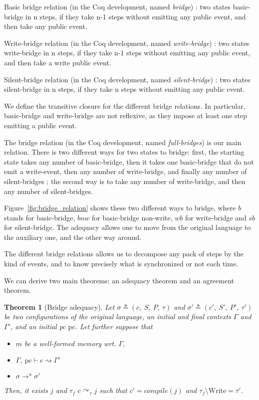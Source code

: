 \documentclass[10pt]{article}
\newcommand{\pc}{\mathrm{pc}}
\newcommand{\ctx}{\Gamma}
\newcommand{\conf}{\sigma}
\newcommand{\typing}[4]{ #1,~#2 \vdash #3 \rightsquigarrow #4}
\newcommand{\execn}[3] { #1 \rightarrow^{#2} #3 }
\newcommand{\bridge}[3] { #1 \curvearrowright_{#2} #3 }
\newtheorem{theorem}{Theorem}
\begin{document}

Basic bridge relation (in the Coq development, named \emph{bridge})
: two states basic-bridge in n steps, if they take n-1 steps without emitting any public
event, and then take any public event.

Write-bridge relation (in the Coq development, named \emph{write-bridge})
: two states write-bridge in n steps, if they take n-1 steps without emitting
any public event, and then take a write public event.

Silent-bridge relation (in the Coq development, named \emph{silent-bridge})
: two states silent-bridge in n steps, if they take n steps without emitting
any public event.

We define the transitive closure for the different bridge relations. In particular, basic-bridge and
write-bridge are not reflexive, as they impose at least one step emitting a public event.

The bridge relation (in the Coq development, named \emph{full-bridges}) is our main relation. There
is two different ways for two states to bridge: first,
the starting state takes any number of basic-bridge, then it takes one basic-bridge that do not emit
a write-event, then any number of write-bridge, and finally any number of silent-bridges ; the second
way is to take any number of write-bridge, and then any number of silent-bridges.

Figure~\ref{fig:bridge_relation} shows these two different ways to bridge, where $b$ stands for
basic-bridge, $bnw$ for basic-bridge non-write, $wb$ for write-bridge and $sb$ for silent-bridge.
The adequacy allows one to move from the original language to the auxiliary one, and the other way around.

The different bridge relations allows us to decompose any pack of steps by the kind of events, and
to know precisely what is synchronized or not each time.

We can derive two main theorems: an adequacy theorem and an agreement theorem.
\begin{theorem}[Bridge adequacy]
  Let $\conf \triangleq (c,~S,~P,~\tau)$ and $\conf' \triangleq (c',~S',~P',~\tau')$ be two
  configurations of the original language, an initial and final contexts $\ctx$ and $\ctx'$, and an
  initial pc $\pc$.
  Let further suppose that

 \begin{itemize}
   \item $m$ be a well-formed memory wrt. $\ctx$,
   \item \(\typing{\ctx}{\pc}{c}{\ctx'} \)
   \item \( \execn{\conf}{n}{\conf'} \)
 \end{itemize}

  Then, it exists $j$ and $\tau_{f}$ \( \bridge{c}{\tau}{j} \) such that $c' = compile(j)$ and $\tau_{f} \setminus \mathrm{Write} = \tau'$.
\end{theorem}
\end{document}
